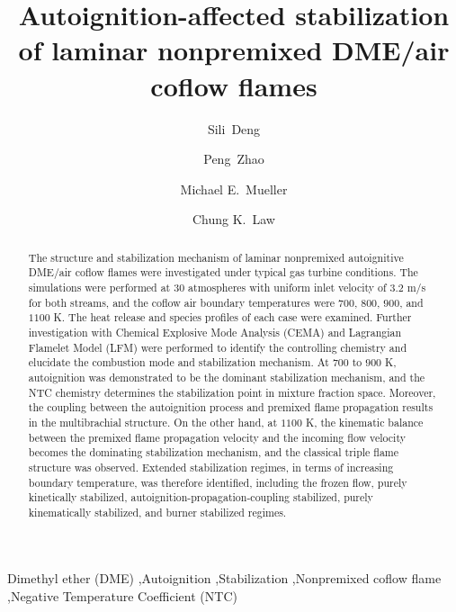 \documentclass[review,3p,times]{elsarticleUS}
\begin{document}
\begin{frontmatter}

\title{Autoignition-affected stabilization of laminar nonpremixed DME/air coflow flames}

\author{Sili~Deng}
\author{Peng~Zhao}
\author{Michael E.~Mueller}
\author{Chung K.~Law}

\address{Department of Mechanical and Aerospace Engineering, Princeton University, Princeton, NJ 08544, USA}

\begin{abstract}

The structure and stabilization mechanism of laminar nonpremixed autoignitive DME/air coflow flames were investigated under typical gas turbine conditions.  The simulations were performed at $30$ atmospheres with uniform inlet velocity of $3.2$ m/s for both streams, and the coflow air boundary temperatures were $700$, $800$, $900$, and $1100$ K.  The heat release and species profiles of each case were examined. Further investigation with Chemical Explosive Mode Analysis (CEMA) and Lagrangian Flamelet Model (LFM) were performed to identify the controlling chemistry and elucidate the combustion mode and stabilization mechanism.  At $700$ to $900$ K, autoignition was demonstrated to be the dominant stabilization mechanism, and the NTC chemistry determines the stabilization point in mixture fraction space.  Moreover, the coupling between the autoignition process and premixed flame propagation results in the multibrachial structure.  On the other hand, at $1100$ K, the kinematic balance between the premixed flame propagation velocity and the incoming flow velocity becomes the dominating stabilization mechanism, and the classical triple flame structure was observed.  Extended stabilization regimes, in terms of increasing boundary temperature, was therefore identified, including the frozen flow, purely kinetically stabilized, autoignition-propagation-coupling stabilized, purely kinematically stabilized, and burner stabilized regimes.           

\end{abstract}

\begin{keyword} 
Dimethyl ether (DME) \sep Autoignition \sep Stabilization \sep Nonpremixed coflow flame \sep Negative Temperature Coefficient (NTC)
\end{keyword}

\end{frontmatter}
\end{document}
